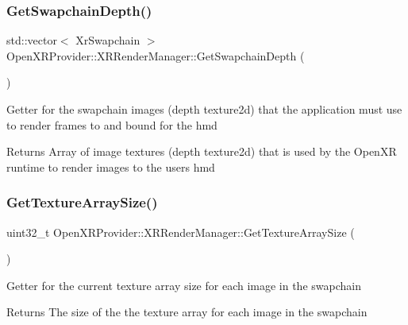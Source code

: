 \subsubsection{\texorpdfstring{GetSwapchainDepth()}{GetSwapchainDepth()}}
{\footnotesize\ttfamily std\+::vector$<$ Xr\+Swapchain $>$ Open\+X\+R\+Provider\+::\+X\+R\+Render\+Manager\+::\+Get\+Swapchain\+Depth (\begin{DoxyParamCaption}{ }\end{DoxyParamCaption})\hspace{0.3cm}{\ttfamily [inline]}}

Getter for the swapchain images (depth texture2d) that the application must use to render frames to and bound for the hmd \begin{DoxyReturn}{Returns}
Array of image textures (depth texture2d) that is used by the Open\+XR runtime to render images to the user\textquotesingle{}s hmd 
\end{DoxyReturn}
\mbox{\label{class_open_x_r_provider_1_1_x_r_render_manager_a87fa0e627b58a7892aa3e6a0efd9ab9b}} 
\subsubsection{\texorpdfstring{GetTextureArraySize()}{GetTextureArraySize()}}
{\footnotesize\ttfamily uint32\+\_\+t Open\+X\+R\+Provider\+::\+X\+R\+Render\+Manager\+::\+Get\+Texture\+Array\+Size (\begin{DoxyParamCaption}{ }\end{DoxyParamCaption})\hspace{0.3cm}{\ttfamily [inline]}}

Getter for the current texture array size for each image in the swapchain \begin{DoxyReturn}{Returns}
The size of the the texture array for each image in the swapchain 
\end{DoxyReturn}
\mbox{\label{class_open_x_r_provider_1_1_x_r_render_manager_aa5216277ffb9f00b43ba78fe0019da3f}} 
